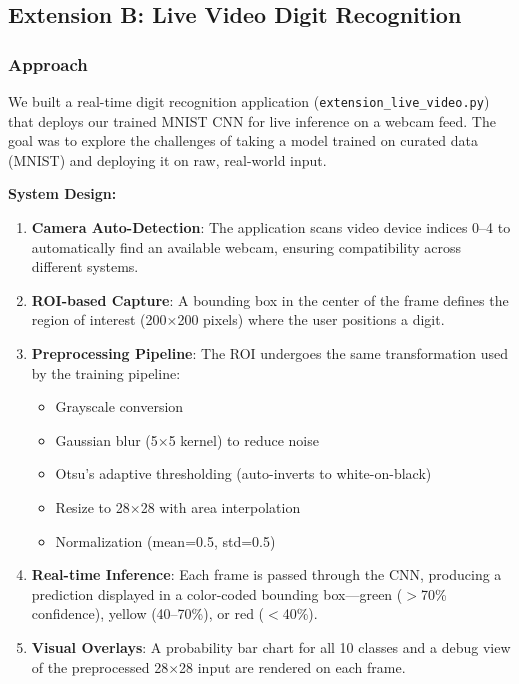 \documentclass[11pt]{article}
\begin{document}
\subsection{Extension B: Live Video Digit Recognition}

\subsubsection{Approach}

We built a real-time digit recognition application (\texttt{extension\_live\_video.py}) that deploys our trained MNIST CNN for live inference on a webcam feed. The goal was to explore the challenges of taking a model trained on curated data (MNIST) and deploying it on raw, real-world input.

\textbf{System Design:}
\begin{enumerate}
    \item \textbf{Camera Auto-Detection}: The application scans video device indices 0--4 to automatically find an available webcam, ensuring compatibility across different systems.
    
    \item \textbf{ROI-based Capture}: A bounding box in the center of the frame defines the region of interest (200$\times$200 pixels) where the user positions a digit.
    
    \item \textbf{Preprocessing Pipeline}: The ROI undergoes the same transformation used by the training pipeline:
    \begin{itemize}
        \item Grayscale conversion
        \item Gaussian blur (5$\times$5 kernel) to reduce noise
        \item Otsu's adaptive thresholding (auto-inverts to white-on-black)
        \item Resize to 28$\times$28 with area interpolation
        \item Normalization (mean=0.5, std=0.5)
    \end{itemize}
    
    \item \textbf{Real-time Inference}: Each frame is passed through the CNN, producing a prediction displayed in a color-coded bounding box---green ($>$70\% confidence), yellow (40--70\%), or red ($<$40\%).
    
    \item \textbf{Visual Overlays}: A probability bar chart for all 10 classes and a debug view of the preprocessed 28$\times$28 input are rendered on each frame.
\end{enumerate}
\end{document}
